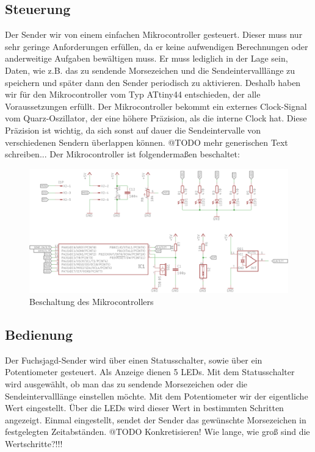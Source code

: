 \subsection{Steuerung}
Der Sender wir von einem einfachen Mikrocontroller gesteuert. Dieser muss nur
sehr geringe Anforderungen erfüllen, da er keine aufwendigen Berechnungen oder anderweitige
Aufgaben bewältigen muss. Er muss lediglich in der Lage sein, Daten, wie z.B. das 
zu sendende Morsezeichen und die Sendeintervalllänge zu speichern und später dann
den Sender periodisch zu aktivieren. Deshalb haben wir für den Mikrocontroller vom
Typ ATtiny44 entschieden, der alle Voraussetzungen erfüllt. Der Mikrocontroller bekommt
ein externes Clock-Signal vom Quarz-Oszillator, der eine höhere Präzision, als die interne
Clock hat. Diese Präzision ist wichtig, da sich sonst auf dauer die Sendeintervalle von
verschiedenen Sendern überlappen können.
@TODO mehr generischen Text schreiben...
Der Mikrocontroller ist folgendermaßen beschaltet:

\begin{figure}[H]
    \includegraphics[scale=0.9]{res/Controller.png}
    \caption{Beschaltung des Mikrocontrollers}
\end{figure}

\subsection{Bedienung}
Der Fuchsjagd-Sender wird über einen Statusschalter, sowie über ein Potentiometer
gesteuert. Als Anzeige dienen 5 LEDs. Mit dem Statusschalter wird ausgewählt, ob
man das zu sendende Morsezeichen oder die Sendeintervalllänge einstellen möchte.
Mit dem Potentiometer wir der eigentliche Wert eingestellt. Über die LEDs wird dieser
Wert in bestimmten Schritten angezeigt. Einmal eingestellt, sendet der Sender das gewünschte
Morsezeichen in festgelegten Zeitabständen. 
@TODO Konkretisieren! Wie lange, wie groß sind die Wertschritte?!!!